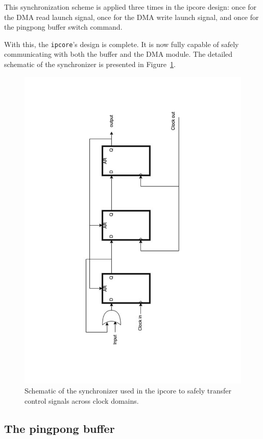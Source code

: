 \documentclass[a4paper,11pt,oneside]{report}
\begin{document}
This synchronization scheme is applied three times in the ipcore design: 
once for the DMA read launch signal, once for the DMA write launch signal, and once for the pingpong buffer switch command.

With this, the \texttt{ipcore}'s design is complete. It is now fully capable of safely communicating with both the buffer and the DMA module. 
The detailed schematic of the synchronizer is presented in Figure~\ref{fig:sync}.

\begin{figure}
    \centering
    \includegraphics[angle=-90, width=\linewidth]{figures/clock_synchronizer.pdf}
    \caption{Schematic of the synchronizer used in the ipcore to safely transfer control signals across clock domains.}
    \label{fig:sync}
\end{figure}


\subsection{The pingpong buffer}
\end{document}
